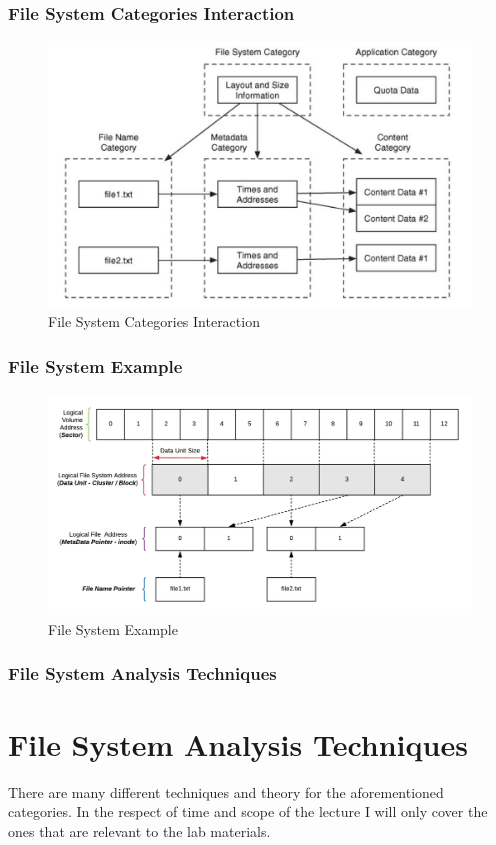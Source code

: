 \documentclass{beamer}
\begin{document}
\begin{frame}
	\frametitle{File System Categories Interaction}
	\begin{figure}[h]
		\includegraphics[scale=0.40]{fs-category-interaction-briancarrier}
		\caption{File System Categories Interaction}
		\label{fig:fs-category-interaction}
	\end{figure}
\end{frame}

\begin{frame}
	\frametitle{File System Example}
	\begin{figure}[h]
		\includegraphics[scale=0.65]{file-system-example}
		\caption{File System Example}
		\label{fig:fs-example}
	\end{figure}
\end{frame}

\begin{frame}
	\frametitle{File System Analysis Techniques}
	\section*{File System Analysis Techniques}
	There are many different techniques and theory for the aforementioned categories. In the respect of time and scope of the lecture I will only cover the ones that are relevant to the lab materials.
\end{frame}
\end{document}
